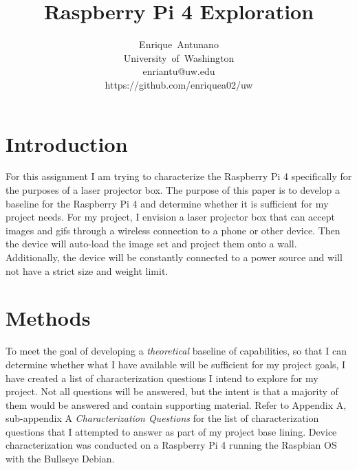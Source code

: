 \documentclass[journal]{IEEEtran}
\begin{document}
    \title{Raspberry Pi 4 Exploration}

    \author{Enrique~Antunano\\University~of~Washington\\enriantu@uw.edu\\https://github.com/enriquea02/uw}


    \maketitle

    \begin{abstract}
    
    \end{abstract}
    \section{Introduction}

    For this assignment I am trying to characterize the Raspberry Pi 4 specifically for the purposes of a laser projector box. 
    The purpose of this paper is to develop a baseline for the Raspberry Pi 4 and determine whether it is sufficient for my project needs.
    For my project, I envision a laser projector box that can accept images and gifs through a wireless connection to a phone or other device. 
    Then the device will auto-load the image set and project them onto a wall. 
    Additionally, the device will be constantly connected to a power source and will not have a strict size and weight limit.

    \section{Methods}
    To meet the goal of developing a \emph{theoretical} baseline of capabilities, so that I can determine whether what I have available will be sufficient for my project goals, 
    I have created a list of characterization questions I intend to explore for my project.
    Not all questions will be answered, but the intent is that a majority of them would be answered and contain supporting material.
    Refer to Appendix A, sub-appendix A \emph{Characterization Questions} for the list of characterization questions that I attempted to answer as part of my project base lining.
    Device characterization was conducted on a Raspberry Pi 4 running the Raspbian OS with the Bullseye Debian.
\end{document}
